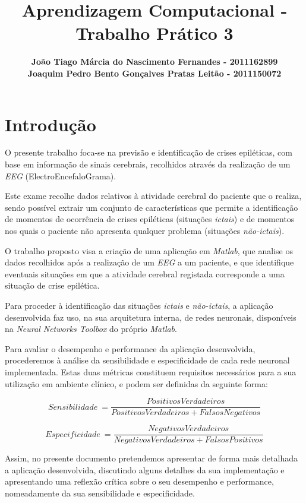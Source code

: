 \documentclass{article}
\title{\bf{Aprendizagem Computacional - Trabalho Prático 3}\vspace{80mm}}
\author{\textbf{João Tiago Márcia do Nascimento Fernandes - 2011162899} \\
\textbf{Joaquim Pedro Bento Gonçalves Pratas Leitão - 2011150072}}
\begin{document}
\maketitle

\pagebreak

\renewcommand*\contentsname{Índice}
\tableofcontents

\pagebreak

\section{Introdução}

O presente trabalho foca-se na previsão e identificação de crises epiléticas, com base em informação de sinais cerebrais, recolhidos através da realização de um \emph{EEG} (ElectroEncefaloGrama).

Este exame recolhe dados relativos à atividade cerebral do paciente que o realiza, sendo possível extrair um conjunto de características que permite a identificação de momentos de ocorrência de crises epiléticas (situações \emph{ictais}) e de momentos nos quais o paciente não apresenta qualquer problema (situações \emph{não-ictais}).

O trabalho proposto visa a criação de uma aplicação em \emph{Matlab}, que analise os dados recolhidos após a realização de um \emph{EEG} a um paciente, e que identifique eventuais situações em que a atividade cerebral registada corresponde a uma situação de crise epilética.

Para proceder à identificação das situações \emph{ictais} e \emph{não-ictais}, a aplicação desenvolvida faz uso, na sua arquitetura interna, de redes neuronais, disponíveis na \emph{Neural Networks Toolbox} do próprio \emph{Matlab}.

Para avaliar o desempenho e performance da aplicação desenvolvida, procederemos à análise da sensibilidade e especificidade de cada rede neuronal implementada. Estas duas métricas constituem requisitos necessários para a sua utilização em ambiente clínico, e podem ser definidas da seguinte forma:

$$Sensibilidade \: = \frac{PositivosVerdadeiros}{PositivosVerdadeiros + FalsosNegativos}$$

$$Especificidade \: = \frac{NegativosVerdadeiros}{NegativosVerdadeiros + FalsosPositivos}$$

\vspace{.1cm}

Assim, no presente documento pretendemos apresentar de forma mais detalhada a aplicação desenvolvida, discutindo alguns detalhes da sua implementação e apresentando uma reflexão crítica sobre o seu desempenho e performance, nomeadamente da sua sensibilidade e especificidade.
\end{document}

